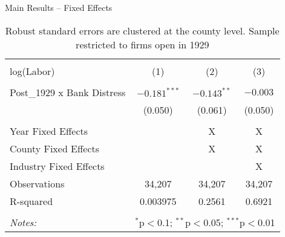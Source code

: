 \documentclass[11pt]{beamer}
\begin{document}
\begin{frame}{Main Results -- Fixed Effects}
\begin{table}  \tiny{
\begin{tabular}{lccc} 
\\[-1.8ex]\hline                                                                                     
 \hline \\[-1.8ex] 
log(Labor) & \multicolumn{1}{c}{(1)} & \multicolumn{1}{c}{(2)} & \multicolumn{1}{c}{(3)}\\    
 \hline \\                                         
 Post\_1929 x Bank Distress & $-0.181^{***}$ & $-0.143^{**}$ & $-0.003$ \\ 
  & (0.050) & (0.061) & (0.050) \\ 
\hline \\
Year Fixed Effects &  & \multicolumn{1}{c}{X} & \multicolumn{1}{c}{X} \\ 
County Fixed Effects &  & \multicolumn{1}{c}{X} & \multicolumn{1}{c}{X} \\ 
Industry Fixed Effects &  &  & \multicolumn{1}{c}{X} \\
Observations & \multicolumn{1}{c}{34,207} &   \multicolumn{1}{c}{34,207} & \multicolumn{1}{c}{34,207} \\
R-squared  &   \multicolumn{1}{c}{0.003975} & \multicolumn{1}{c}{0.2561} & \multicolumn{1}{c}{0.6921} \\
\hline 
\hline \\[-1.8ex] 
\textit{Notes:}  & \multicolumn{3}{r}{$^{*}$p$<$0.1; $^{**}$p$<$0.05; $^{***}$p$<$0.01}
\end{tabular}
}
\caption{\tiny{Robust standard errors are clustered at the county level. Sample restricted to firms open in 1929}}
\end{table}
\end{frame}
\end{document}
